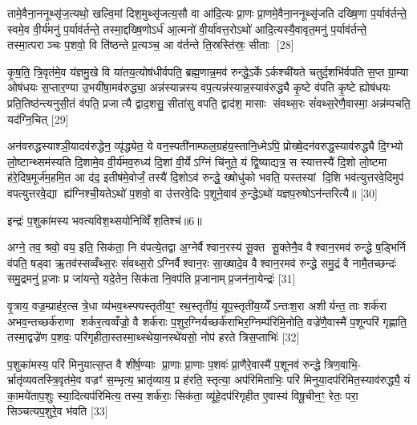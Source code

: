 तामे॒वैना॒ननूथ्सृ॑ज॒त्यथो॒ खल्वि॒मां दिश॒मुथ्सृ॑जत्य॒सौ वा आ॑दि॒त्यः प्रा॒णः प्रा॒णमे॒वैना॒ननूथ्सृ॑जति दख्षि॒णा प॒र्याव॑र्तन्ते॒ स्वमे॒व वी॒र्य॑मनु॑ प॒र्याव॑र्तन्ते॒ तस्मा॒द्दख्षि॒णोऽर्ध॑ आ॒त्मनो॑ वी॒र्या॑वत्त॒रोऽथो॑ आदि॒त्यस्यै॒वावृत॒मनु॑ प॒र्याव॑र्तन्ते॒ तस्मा॒त्पराञ्चः प॒शवो॒ वि ति॑ष्ठन्ते प्र॒त्यञ्च॒ आ व॑र्तन्ते ति॒स्रस्ति॑स्रः॒ सीताः [28]

कृ॒ष॒ति॒ त्रि॒वृत॑मे॒व य॑ज्ञमु॒खे वि या॑तय॒त्योष॑धीर्वपति॒ ब्रह्म॒णान्न॒मव॑ रुन्द्धे॒ऽर्केऽर्कश्ची॑यते चतुर्द॒शभि॑र्वपति स॒प्त ग्रा॒म्या ओष॑धयः स॒प्तार॒ण्या उ॒भयी॑षा॒मव॑रुद्ध्या॒ अन्न॑स्यान्नस्य वप॒त्यन्न॑स्यान्न॒स्याव॑रुद्ध्यै कृ॒ष्टे व॑पति कृ॒ष्टे ह्योष॑धयः प्रति॒तिष्ठ॑न्त्यनुसी॒तं व॑पति॒ प्रजात्यै द्वाद॒शसु॒ सीता॑सु वपति॒ द्वाद॑श॒ मासाः संवथ्स॒रः सं॑वथ्स॒रेणै॒वास्मा॒ अन्न॑म्पचति॒ यद॑ग्नि॒चित् [29]

अन॑वरुद्धस्याश्ञी॒यादव॑रुद्धेन॒ व्यृ॑द्ध्येत॒ ये वन॒स्पती॑नाम्फल॒ग्रह॑य॒स्तानि॒ध्मेऽपि॒ प्रोख्षे॒दन॑वरुद्ध॒स्याव॑रुद्ध्यै दि॒ग्भ्यो लो॒ष्टान्थ्सम॑स्यति दि॒शामे॒व वी॒र्य॑मव॒रुध्य॑ दि॒शां वी॒र्येऽग्निं चि॑नुते॒ यं द्वि॒ष्याद्यत्र॒ स स्यात्तस्यै॑ दि॒शो लो॒ष्टमा ह॑रे॒दिष॒मूर्ज॑म॒हमि॒त आ द॑द॒ इतीष॑मे॒वोर्जं॒ तस्यै॑ दि॒शोऽव॑ रुन्द्धे॒ ख्षोधु॑को भवति॒ यस्तस्यां दि॒शि भव॑त्युत्तरवे॒दिमुप॑ वपत्युत्तरवे॒द्या ह्य॑ग्निश्ची॒यतेऽथो॑ प॒शवो॒ वा उ॑त्तरवे॒दिः प॒शूने॒वाव॑ रु॒न्द्धेऽथो॑ यज्ञप॒रुषोऽन॑न्तरित्यै॥ [30]

{\scriptsize {इन्द्रः॑ प॒शुका॑मस्य भवत्यविश॒थ्सयो॑निव्विँश॒तिश्च॑॥6॥}}

अग्ने॒ तव॒ श्रवो॒ वय॒ इति॒ सिक॑ता॒ नि व॑पत्ये॒तद्वा अ॒ग्नेर्वैश्वान॒रस्य॑ सू॒क्त सू॒क्तेनै॒व वैश्वान॒रमव॑ रुन्द्धे ष॒ड्भिर्नि व॑पति॒ षड्वा ऋ॒तव॑स्सव्वँथ्स॒रः सं॑वथ्स॒रोऽग्निर्वैश्वान॒रः सा॒ख्षादे॒व वैश्वान॒रमव॑ रुन्द्धे समु॒द्रं वै नामै॒तच्छन्दः॑ समु॒द्रमनु॑ प्र॒जाः प्र जा॑यन्ते॒ यदे॒तेन॒ सिक॑ता नि॒वप॑ति प्र॒जानाम्प्र॒जन॑ना॒येन्द्रः॑ [31]

वृ॒त्राय॒ वज्र॒म्प्राह॑र॒त्स त्रे॒धा व्य॑भव॒थ्स्फ्यस्तृती॑य॒ꣳ॒ रथ॒स्तृती॑यं॒ यूप॒स्तृती॑य॒य्येँऽन्तःश॒रा अशीर्यन्त॒ ताः शर्क॑रा अभव॒न्तच्छर्क॑राणा शर्कर॒त्वव्वँज्रो॒ वै शर्क॑राः प॒शुर॒ग्निर्यच्छर्क॑राभिर॒ग्निम्प॑रिमि॒नोति॒ वज्रे॑णै॒वास्मै॑ प॒शून्परि॑ गृह्णाति॒ तस्मा॒द्वज्रे॑ण प॒शवः॒ परि॑गृहीता॒स्तस्मा॒थ्स्थेया॒नस्थे॑यसो॒ नोप॑ हरते त्रिस॒प्ताभिः॑ [32]

प॒शुका॑मस्य॒ परि॑ मिनुयात्स॒प्त वै शी॑र्\mbox{}ष॒ण्याः प्रा॒णाः प्रा॒णाः प॒शवः॑ प्रा॒णैरे॒वास्मै॑ प॒शूनव॑ रुन्द्धे त्रिण॒वाभि॒- र्भ्रातृ॑व्यवतस्त्रि॒वृत॑मे॒व वज्रꣳ॑ स॒म्भृत्य॒ भ्रातृ॑व्याय॒ प्र ह॑रति॒ स्तृत्या॒ अप॑रिमिताभिः॒ परि॑ मिनुया॒दप॑रिमित॒स्याव॑रुद्ध्यै॒ यं का॒मये॑ताप॒शुः स्या॒दित्यप॑रिमित्य॒ तस्य॒ शर्क॑राः॒ सिक॑ता॒ व्यू॑हे॒दप॑रिगृहीत ए॒वास्य॑ विषू॒चीन॒ꣳ॒ रेतः॒ परा॒ सिञ्चत्यप॒शुरे॒व भ॑वति [33]

